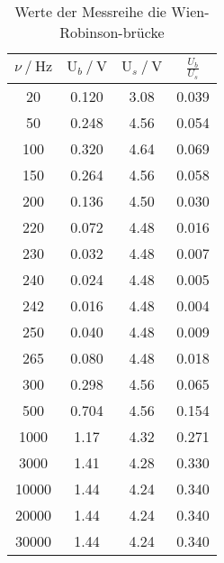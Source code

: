 \begin{table}[H]
  \centering
  \caption{Werte der Messreihe die Wien-Robinson-brücke}
  \label{tab:tabe8}
    \begin{tabular}{c c c c}
    \toprule
    $ \nu \: / \: \si{\hertz} $ & $\text{U}_b \: / \: \si{\volt} $ &
    $\text{U}_s \: / \: \si{\volt} $ &
    $\frac{U_b}{U_s}$ \\
    \midrule
    20 & 0.120 & 3.08 & 0.039 \\
    50 & 0.248 & 4.56 & 0.054 \\
    100 & 0.320 & 4.64 & 0.069 \\
    150 & 0.264 & 4.56 & 0.058 \\
    200 & 0.136 & 4.50 & 0.030 \\
    220 & 0.072 & 4.48 & 0.016 \\
    230 & 0.032 & 4.48 & 0.007 \\
    240 & 0.024 & 4.48 & 0.005 \\
    242 & 0.016 & 4.48 & 0.004 \\
    250 & 0.040 & 4.48 & 0.009 \\
    265 & 0.080 & 4.48 & 0.018 \\
    300 & 0.298 & 4.56 & 0.065 \\
    500 & 0.704 & 4.56 & 0.154 \\
    1000 & 1.17 & 4.32 & 0.271 \\
    3000 & 1.41 & 4.28 & 0.330 \\
    10000 & 1.44 & 4.24 & 0.340 \\
    20000 & 1.44 & 4.24 & 0.340 \\
    30000 & 1.44 & 4.24 & 0.340 \\

    \bottomrule
    \end{tabular}
\end{table}

